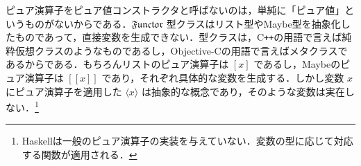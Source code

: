 \documentclass[a4paper]{jsbook}
\def\[{\left[\!\left[}
\def\]{\right]\!\right]}
\newcommand{\programminglanguage}[1]{\textsf{#1}}
\newcommand{\cxx}{\programminglanguage{C}\texttt{++}}
\newcommand{\objectivec}{\programminglanguage{Objective-C}}
\newcommand{\haskell}{\programminglanguage{Haskell}}
\newcommand{\keyword}[1]{{\underline{\emph{#1}}}}
\newcommand{\mType}[1]{\mathbf{#1}}
\newcommand{\mListType}[1]{[\mType{#1}]}
\newcommand{\mMaybeType}[1]{\[\mType{#1}\]}
\newcommand{\mFunctor}[1]{\textit{\textbf{#1}}}
\newcommand{\mTypeConstructor}[1]{\mathit{#1}} %
\newcommand{\mSpecialTypeClass}[1]{\mathfrak{#1}} %
\newcommand{\mFunctorTypeClass}{\mSpecialTypeClass{Functor}}
\newcommand{\mListWith}[1]{\left[#1\right]}
\newcommand{\mTupleWith}[1]{\left(#1\right)}
\newcommand{\mMaybeWith}[1]{\[#1\]}
\newcommand{\mPureWith}[1]{\langle#1\rangle}
\DeclareMathOperator{\mMap}{\bullet}
\DeclareMathOperator{\mMapList}{\odot}
\DeclareMathOperator{\mMapMaybe}{\boxdot}
\DeclareMathOperator{\mListTypeConstructor}{\mTypeConstructor{List}}
\DeclareMathOperator{\mMaybeTypeConstructor}{\mTypeConstructor{Maybe}}
\DeclareMathOperator{\mListFunctor}{\mFunctor{List}}
\DeclareMathOperator{\mMaybeFunctor}{\mFunctor{Maybe}}
\newcommand{\mathMaybeMap}{\mathbin{\boxdot}}
\begin{document}
ピュア演算子をピュア値コンストラクタと呼ばないのは，単純に「ピュア値」というものがないからである．$\mFunctorTypeClass$ 型クラスはリスト型やMaybe型を抽象化したものであって，直接変数を生成できない．型クラスは，\cxx の用語で言えば純粋仮想クラスのようなものであるし，\objectivec の用語で言えばメタクラスであるからである．もちろんリストのピュア演算子は $\mListWith{x}$ であるし，Maybeのピュア演算子は $\mMaybeWith{x}$ であり，それぞれ具体的な変数を生成する．しかし変数 $x$ にピュア演算子を適用した $\mPureWith{x}$ は抽象的な概念であり，そのような変数は実在しない．\footnote{\haskell は一般のピュア演算子の実装を与えていない．変数の型に応じて対応する関数が適用される．}





\end{document}
